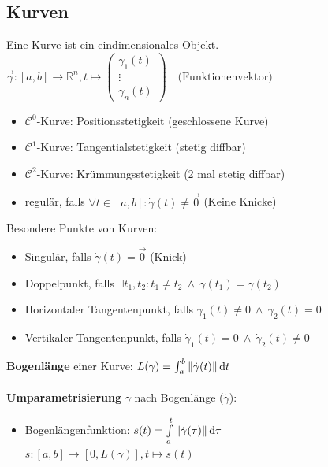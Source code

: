 \documentclass[6pt,a4paper]{scrartcl}
\newcommand{\norm}[2][\relax]{\ifx#1\relax \ensuremath{\left\Vert#2\right\Vert}\else \ensuremath{\left\Vert#2\right\Vert_{#1}}\fi}
\newcommand{\ra}[0]{\ensuremath{\rightarrow}}
\begin{document}
\begin{multicols*}{4}
	
\subsection{Kurven}
Eine Kurve ist ein eindimensionales Objekt.\\
$ \vec \gamma:[a,b] \rightarrow \mathbb R^n, t \mapsto \begin{pmatrix} \gamma_1(t) \\ \vdots \\ \gamma_n(t) \end{pmatrix} \quad \text{(Funktionenvektor)} $
\begin{itemize}\itemsep-2pt
	\item $\mathcal C^0$-Kurve: Positionsstetigkeit (geschlossene Kurve)
	\item $\mathcal C^1$-Kurve: Tangentialstetigkeit (stetig diffbar)
	\item $\mathcal C^2$-Kurve: Krümmungsstetigkeit (2 mal stetig diffbar)
	\item regulär, falls $\forall t \in [a,b]:\dot \gamma(t) \ne \vec 0$ (Keine Knicke)
\end{itemize}
Besondere Punkte von Kurven:
\begin{itemize}\itemsep-2pt
	\item Singulär, falls $\dot \gamma(t)=\vec 0$ (Knick)
	\item Doppelpunkt, falls $\exists t_1,t_2:t_1 \ne t_2 \ \land \ \gamma(t_1)=\gamma(t_2)$
	\item Horizontaler Tangentenpunkt, falls $\dot \gamma_1(t) \ne 0 \ \land \ \dot \gamma_2(t)=0$
	\item Vertikaler Tangentenpunkt, falls $\dot \gamma_1(t) = 0 \ \land \ \dot \gamma_2(t) \ne 0$
\end{itemize}
\textbf{Bogenlänge} einer Kurve: $L(\gamma) = \int_{a}^{b} \norm{\dot \gamma(t)} \mathrm dt$ \\ \\
\textbf{Umparametrisierung} $\gamma$ nach Bogenlänge ($\tilde \gamma$):
\begin{itemize} \itemsep0pt
	\item Bogenlängenfunktion: $s(t) = \int\limits_a^t \norm{\dot \gamma(\tau)} \mathrm d\tau$\\
		$s: [a,b] \ra [0,L(\gamma)], t \mapsto s(t)$

\end{itemize}
\end{multicols*}
\end{document}
